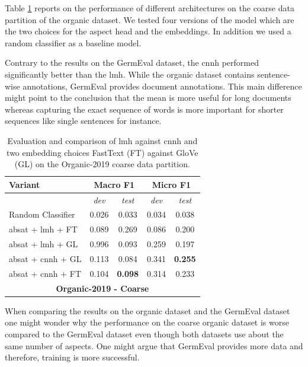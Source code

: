 \bigskip
Table \ref{tab:06_resultsOrganic2} reports on the performance of different architectures on the coarse data partition of the organic dataset. We tested four versions of the model which are the two choices for the aspect head and the embeddings. In addition we used a random classifier as a baseline model.
\medskip

Contrary to the results on the GermEval dataset, the \acrfull{cnnh} performed significantly better than the \acrfull{lmh}. While the organic dataset contains sentence-wise annotations, GermEval provides document annotations. This main difference might point to the conclusion that the mean is more useful for long documents whereas capturing the exact sequence of words is more important for shorter sequences like single sentences for instance. 
\bigskip

\begin{table}[htb]
	\centering
	\begin{tabular*}{\textwidth}{l@{\extracolsep{\fill}}cccc@{}}
	\toprule
	Variant          & \multicolumn{2}{c}{\textbf{Macro F1}}     & \multicolumn{2}{c}{\textbf{Micro F1}}       \\ 
	\midrule
					 & \textit{dev}      	& \textit{test} 		& \textit{dev}      		& \textit{test} 		\\
	\midrule

	Random Classifier          		&  0.026 		& 0.033&  0.034 &   0.038  				\\
	\gls{absat} + \gls{lmh} + FT    & 0.089     & 0.269	&  0.086 &   0.200   			\\ 
	\gls{absat} + \gls{lmh} + GL    & 0.996     & 0.093	&  0.259 &   0.197   			\\ 

	\gls{absat} + \gls{cnnh} + GL   & 0.113     & 0.084	& 0.341   &  \textbf{0.255} 				\\ 	
	\gls{absat} + \gls{cnnh} + FT   & 0.104     & \textbf{0.098} & 0.314  &   0.233				\\ 
	\bottomrule
	\multicolumn{5}{c}{\textbf{Organic-2019 - Coarse}} \\
	\end{tabular*}
	\caption{Evaluation and comparison of \acrfull{lmh} against \acrfull{cnnh} and two embedding choices FastText {(FT)} against GloVe {(GL)} on the Organic-2019 coarse data partition.}
	\label{tab:06_resultsOrganic2}
\end{table}

When comparing the results on the organic dataset and the GermEval dataset one might wonder why the performance on the coarse organic dataset is worse compared to the GermEval dataset even though both datasets use about the same number of aspects. One might argue that GermEval provides more data and therefore, training is more successful.

